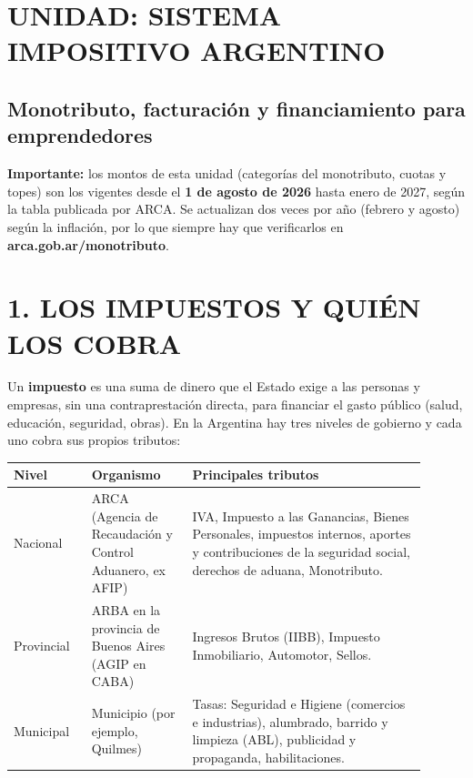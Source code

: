 \clearpage
\section*{UNIDAD: SISTEMA IMPOSITIVO ARGENTINO}
\subsection*{Monotributo, facturación y financiamiento para emprendedores}

\begin{recuadro}
\textbf{Importante:} los montos de esta unidad (categorías del monotributo, cuotas y topes)
son los vigentes desde el \textbf{1 de agosto de 2026} hasta enero de 2027, según la tabla
publicada por ARCA. Se actualizan dos veces por año (febrero y agosto) según la inflación,
por lo que siempre hay que verificarlos en \textbf{arca.gob.ar/monotributo}.
\end{recuadro}

\section*{1. LOS IMPUESTOS Y QUIÉN LOS COBRA}

Un \textbf{impuesto} es una suma de dinero que el Estado exige a las personas y empresas,
sin una contraprestación directa, para financiar el gasto público (salud, educación,
seguridad, obras). En la Argentina hay tres niveles de gobierno y cada uno cobra sus propios
tributos:

\begin{center}
\small
\begin{tabular}{|p{0.17\linewidth}|p{0.22\linewidth}|p{0.51\linewidth}|}
\hline
\textbf{Nivel} & \textbf{Organismo} & \textbf{Principales tributos} \\ \hline
Nacional & ARCA (Agencia de Recaudación y Control Aduanero, ex AFIP) &
IVA, Impuesto a las Ganancias, Bienes Personales, impuestos internos, aportes y
contribuciones de la seguridad social, derechos de aduana, Monotributo. \\ \hline
Provincial & ARBA en la provincia de Buenos Aires (AGIP en CABA) &
Ingresos Brutos (IIBB), Impuesto Inmobiliario, Automotor, Sellos. \\ \hline
Municipal & Municipio (por ejemplo, Quilmes) &
Tasas: Seguridad e Higiene (comercios e industrias), alumbrado, barrido y limpieza (ABL),
publicidad y propaganda, habilitaciones. \\ \hline
\end{tabular}
\end{center}

